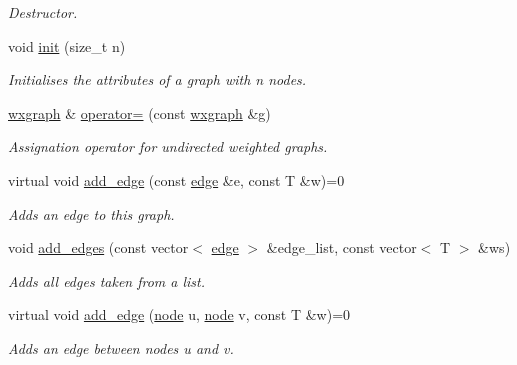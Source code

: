 \begin{DoxyCompactItemize}
\begin{DoxyCompactList}\small\item\em Destructor. \end{DoxyCompactList}\item 
void \hyperlink{classlgraph_1_1utils_1_1wxgraph_a566ae9fe69209230ef159ed350ab8f7f}{init} (size\+\_\+t n)
\begin{DoxyCompactList}\small\item\em Initialises the attributes of a graph with {\itshape n} nodes. \end{DoxyCompactList}\item 
\hyperlink{classlgraph_1_1utils_1_1wxgraph}{wxgraph} \& \hyperlink{classlgraph_1_1utils_1_1wxgraph_a09fdb762864b9c663f8e2acf835e5191}{operator=} (const \hyperlink{classlgraph_1_1utils_1_1wxgraph}{wxgraph} \&g)
\begin{DoxyCompactList}\small\item\em Assignation operator for undirected weighted graphs. \end{DoxyCompactList}\item 
virtual void \hyperlink{classlgraph_1_1utils_1_1wxgraph_a8bee4a49537954adf70d720e0677caee}{add\+\_\+edge} (const \hyperlink{namespacelgraph_1_1utils_a6510284ce1b1ae5dc97ce5d2de426e10}{edge} \&e, const T \&w)=0
\begin{DoxyCompactList}\small\item\em Adds an edge to this graph. \end{DoxyCompactList}\item 
void \hyperlink{classlgraph_1_1utils_1_1wxgraph_a972a2483966f4b1d485c5d14157ee9be}{add\+\_\+edges} (const vector$<$ \hyperlink{namespacelgraph_1_1utils_a6510284ce1b1ae5dc97ce5d2de426e10}{edge} $>$ \&edge\+\_\+list, const vector$<$ T $>$ \&ws)
\begin{DoxyCompactList}\small\item\em Adds all edges taken from a list. \end{DoxyCompactList}\item 
virtual void \hyperlink{classlgraph_1_1utils_1_1wxgraph_a2cc33d25e8e593fa48cc05fdf0e96f9f}{add\+\_\+edge} (\hyperlink{namespacelgraph_1_1utils_a7bd66ede3805ef121bc2835bd48de0cf}{node} u, \hyperlink{namespacelgraph_1_1utils_a7bd66ede3805ef121bc2835bd48de0cf}{node} v, const T \&w)=0
\begin{DoxyCompactList}\small\item\em Adds an edge between nodes {\itshape u} and {\itshape v}. \end{DoxyCompactList}\item 

\end{DoxyCompactItemize}
